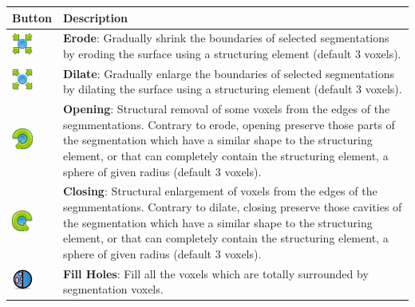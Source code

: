 \begin{tabular}{| m{1.3cm} | m{13.5cm} |}
\hline
\textbf{Button} & \textbf{Description}\\
\hline
\includegraphics[width=0.7cm]{../../frontend/rsc/erode} &
\textbf{Erode}: Gradually shrink the boundaries of selected segmentations by eroding the surface using a structuring element (default 3 voxels).\\
\hline
\includegraphics[width=0.7cm]{../../frontend/rsc/dilate} &
\textbf{Dilate}: Gradually enlarge the boundaries of selected segmentations by dilating the surface using a structuring element (default 3 voxels). \\
\hline
\includegraphics[width=0.7cm]{../../frontend/rsc/open} &
\textbf{Opening}: Structural removal of some voxels from the edges of the segmmentations. Contrary to erode, opening preserve those parts of the segmentation which have a similar shape to the structuring element, or that can completely contain the structuring element, a sphere of given radius (default 3 voxels).\\
\hline
\includegraphics[width=0.7cm]{../../frontend/rsc/close} &
\textbf{Closing}: Structural enlargement of voxels from the edges of the segmmentations. Contrary to dilate, closing preserve those cavities of the segmentation which have a similar shape to the structuring element, or that can completely contain the structuring element, a sphere of given radius (default 3 voxels).\\
\hline
\includegraphics[width=0.7cm]{../../frontend/rsc/fillHoles} &
\textbf{Fill Holes}: Fill all the voxels which are totally surrounded by
segmentation voxels.\\
\hline
\end{tabular}
